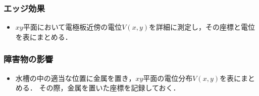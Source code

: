 \subsubsection{エッジ効果}
\begin{itemize}
    \item $xy$平面において電極板近傍の電位$V(x,y)$を詳細に測定し，その座標と電位を表にまとめる．
\end{itemize}

\subsubsection{障害物の影響}
\begin{itemize}
    \item 水槽の中の適当な位置に金属を置き，$xy$平面の電位分布$V(x,y)$を表にまとめる．
    その際，金属を置いた座標を記録しておく．
\end{itemize}